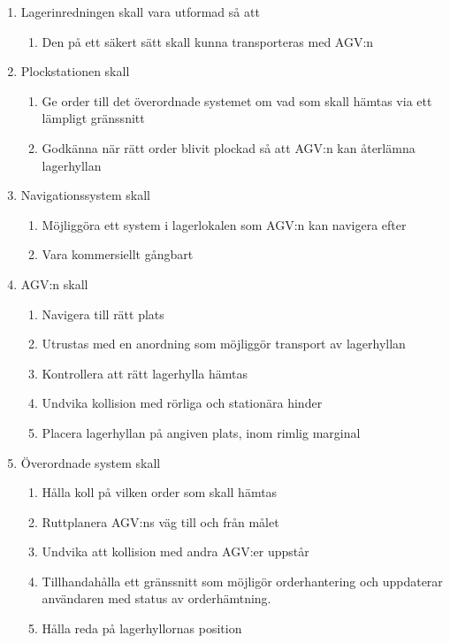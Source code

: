 \documentclass[a4paper,11pt]{article}
\begin{document}
\begin{enumerate}
  \item Lagerinredningen skall vara utformad så att
  \begin{enumerate}
    \item Den på ett säkert sätt skall kunna transporteras med AGV:n
  \end{enumerate}

  \item Plockstationen skall
  \begin{enumerate}
    \item Ge order till det överordnade systemet om vad som skall hämtas
		via ett lämpligt gränssnitt
    \item Godkänna när rätt order blivit plockad så att AGV:n kan återlämna lagerhyllan
  \end{enumerate}

  \item Navigationssystem skall
  \begin{enumerate}
    \item Möjliggöra ett system i lagerlokalen som AGV:n kan navigera efter
	\item Vara kommersiellt gångbart
  \end{enumerate}

  \item AGV:n skall
  \begin{enumerate}
    \item Navigera till rätt plats
    \item Utrustas med en anordning som möjliggör transport av lagerhyllan
    \item Kontrollera att rätt lagerhylla hämtas
    \item Undvika kollision med rörliga och stationära hinder
    \item Placera lagerhyllan på angiven plats, inom rimlig marginal
  \end{enumerate}

  \item Överordnade system skall
  \begin{enumerate}
    \item Hålla koll på vilken order som skall hämtas
    \item Ruttplanera AGV:ns väg till och från målet
    \item Undvika att kollision med andra AGV:er uppstår
	\item Tillhandahålla ett gränssnitt som möjligör orderhantering och
		uppdaterar användaren med status av orderhämtning.
    \item Hålla reda på lagerhyllornas position
  \end{enumerate}
\end{enumerate}
\end{document}

